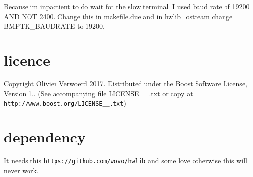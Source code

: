Because i\textquotesingle{}m inpactient to do wait for the slow terminal. I used baud rate of 19200 A\+ND N\+OT 2400. Change this in makefile.\+due and in hwlib\+\_\+ostream change B\+M\+P\+T\+K\+\_\+\+B\+A\+U\+D\+R\+A\+TE to 19200.\hypertarget{index_licence}{}\section{licence}\label{index_licence}
Copyright Olivier Verwoerd 2017. Distributed under the Boost Software License, Version 1.. (See accompanying file L\+I\+C\+E\+N\+S\+E\+\_\+\_.\+txt or copy at \href{http://www.boost.org/LICENSE_1_0.txt}{\tt http\+://www.\+boost.\+org/\+L\+I\+C\+E\+N\+S\+E\+\_\+\_.\+txt})\hypertarget{index_dependency}{}\section{dependency}\label{index_dependency}
It needs this \href{https://github.com/wovo/hwlib}{\tt https\+://github.\+com/wovo/hwlib} and some love otherwise this will never work. 